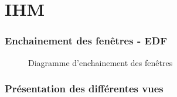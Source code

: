 \part{IHM}
\setcounter{section}{0}

\section{Enchainement des fenêtres - EDF}

\begin{figure}[H]
\noindent{}
\caption{Diagramme d'enchainement des fenêtres}
\end{figure}

\clearpage
\section{Présentation des différentes vues}

%
